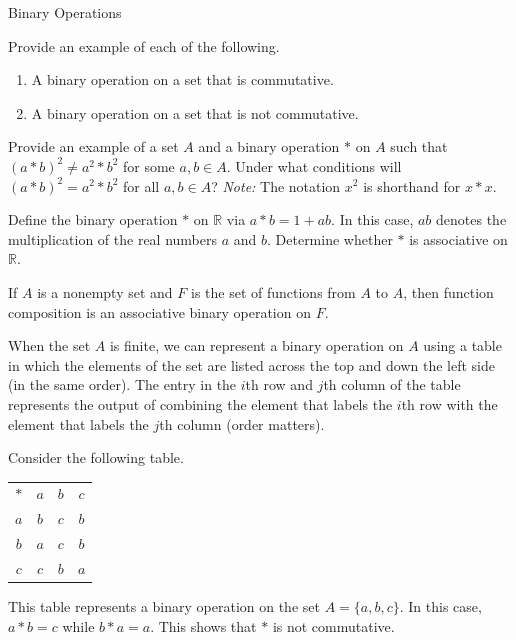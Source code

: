 \begin{section}{Binary Operations}
\begin{problem}
Provide an example of each of the following.
\begin{enumerate}[label=\textrm{(\alph*)}]
\item A binary operation on a set that is commutative.
\item A binary operation on a set that is not commutative.
\end{enumerate}
\end{problem}

\begin{problem}
Provide an example of a set $A$ and a binary operation $*$ on $A$ such that $(a*b)^2\neq a^2*b^2$ for some $a,b\in A$.  Under what conditions will $(a*b)^2= a^2*b^2$ for all $a,b\in A$? \emph{Note:} The notation $x^2$ is shorthand for $x*x$.
\end{problem}

\begin{problem}
Define the binary operation $*$ on $\mathbb{R}$ via $a*b=1+ab$. In this case, $ab$ denotes the multiplication of the real numbers $a$ and $b$. Determine whether $*$ is associative on $\mathbb{R}$.
\end{problem}

\begin{theorem}\label{thm:function_comp_associative}
If $A$ is a nonempty set and $F$ is the set of functions from $A$ to $A$, then function composition is an associative binary operation on $F$.
\end{theorem}

When the set $A$ is finite, we can represent a binary operation on $A$ using a table in which the elements of the set are listed across the top and down the left side (in the same order).  The entry in the $i$th row and $j$th column of the table represents the output of combining the element that labels the $i$th row with the element that labels the $j$th column (order matters).

\begin{example}\label{example:table1}
Consider the following table.
\begin{center}
\begin{tabular}{c!{\vrule width 2pt}c|c|c}
$*$ & $a$ & $b$ & $c$ \\ 
$a$ & $b$ & $c$ & $b$ \\
\hline $b$ & $a$ & $c$ & $b$  \\
\hline $c$ & $c$ & $b$ & $a$
\end{tabular}
\end{center}
This table represents a binary operation on the set $A=\{a,b,c\}$.  In this case, $a*b=c$ while $b*a=a$.  This shows that $*$ is not commutative.
\end{example}


\end{section}
